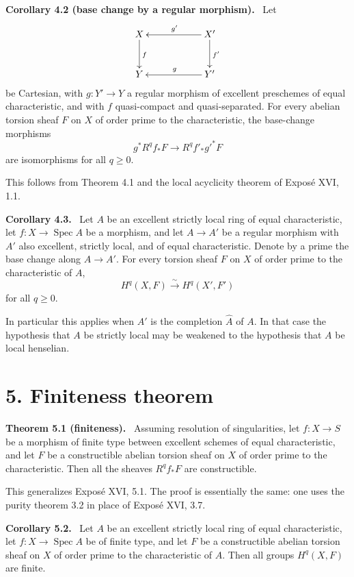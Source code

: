 \documentclass[12pt]{article}
\DeclareMathOperator{\Spec}{Spec}
\newenvironment{statement}[1]{\par\medskip\noindent\textbf{#1.}\ }{\par\medskip}
\begin{document}
\begin{statement}{Corollary 4.2 (base change by a regular morphism)}
Let
\[
\xymatrix@C=2.0cm@R=1.0cm{
X\ar[d]^f&X'\ar[l]_{g'}\ar[d]^{f'}\\
Y&Y'\ar[l]_g
}
\]
be Cartesian, with $g:Y'\to Y$ a regular morphism of excellent preschemes of equal characteristic, and with $f$ quasi-compact and quasi-separated. For every abelian torsion sheaf $F$ on $X$ of order prime to the characteristic, the base-change morphisms
\[
   g^*R^qf_*F\longrightarrow R^qf'_*{g'}^*F
\]
are isomorphisms for all $q\ge0$.
\end{statement}

This follows from Theorem 4.1 and the local acyclicity theorem of Expos\'e XVI, 1.1.

\begin{statement}{Corollary 4.3}
Let $A$ be an excellent strictly local ring of equal characteristic, let $f:X\to\Spec A$ be a morphism, and let $A\to A'$ be a regular morphism with $A'$ also excellent, strictly local, and of equal characteristic. Denote by a prime the base change along $A\to A'$. For every torsion sheaf $F$ on $X$ of order prime to the characteristic of $A$,
\[
   H^q(X,F)\xrightarrow{\sim}H^q(X',F')
\]
for all $q\ge0$.
\end{statement}

In particular this applies when $A'$ is the completion $\widehat A$ of $A$. In that case the hypothesis that $A$ be strictly local may be weakened to the hypothesis that $A$ be local henselian.

\section*{5. Finiteness theorem}

\begin{statement}{Theorem 5.1 (finiteness)}
Assuming resolution of singularities, let $f:X\to S$ be a morphism of finite type between excellent schemes of equal characteristic, and let $F$ be a constructible abelian torsion sheaf on $X$ of order prime to the characteristic. Then all the sheaves $R^qf_*F$ are constructible.
\end{statement}

This generalizes Expos\'e XVI, 5.1. The proof is essentially the same: one uses the purity theorem 3.2 in place of Expos\'e XVI, 3.7.

\begin{statement}{Corollary 5.2}
Let $A$ be an excellent strictly local ring of equal characteristic, let $f:X\to\Spec A$ be of finite type, and let $F$ be a constructible abelian torsion sheaf on $X$ of order prime to the characteristic of $A$. Then all groups $H^q(X,F)$ are finite.
\end{statement}
\end{document}

